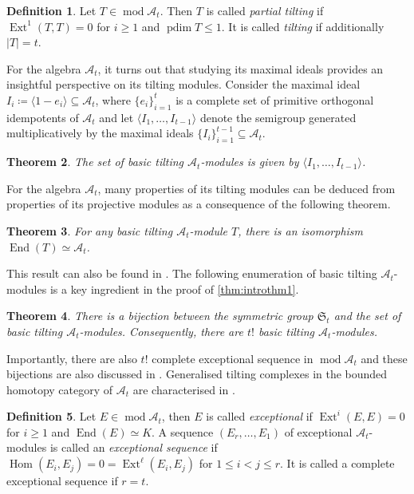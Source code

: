 \documentclass[10pt,twoside, a4paper,reqno]{amsart}
\DeclareMathOperator{\mods}{mod}
\DeclareMathOperator{\Ext}{Ext}
\DeclareMathOperator{\Hom}{Hom}
\DeclareMathOperator{\End}{End}
\DeclareMathOperator{\projdim}{pdim}
\newcommand{\A}{\mathscr{A}}
\newtheorem{theorem}{Theorem}[section]
\theoremstyle{definition}
\newtheorem{definition}[theorem]{Definition}
\begin{document}
\begin{definition}\label{defn:tilting}
    Let $T \in \mods \A_t$. Then $T$ is called \textit{partial tilting} if $\Ext^1(T,T) = 0$ for $i \geq 1$ and $\projdim T \leq 1$. It is called \textit{tilting} if additionally $|T|=t$.
\end{definition}

For the algebra $\A_t$, it turns out that studying its maximal ideals provides an insightful perspective on its tilting modules. Consider the maximal ideal $I_i \coloneqq \langle 1-e_i \rangle \subseteq \A_t$, where $\{e_i\}_{i=1}^t$ is a complete set of primitive orthogonal idempotents of $\A_t$ and let $\langle I_1, \dots, I_{t-1} \rangle$ denote the semigroup generated multiplicatively by the maximal ideals $\{I_i\}_{i=1}^{t-1} \subseteq \A_t$. 

\begin{theorem}\cite[Thm. 1.1(1)]{IyamaZhang2020}\label{thm:idealsemigroup}
    The set of basic tilting $\A_t$-modules is given by $\langle I_1, \dots, I_{t-1} \rangle$. 
\end{theorem}

For the algebra $\A_t$, many properties of its tilting modules can be deduced from properties of its projective modules as a consequence of the following theorem.

\begin{theorem}\cite[Thm. 4]{BHRR1999}\label{thm:tiltingendo}
    For any basic tilting $\A_t$-module $T$, there is an isomorphism $\End(T) \simeq \A_t$. 
\end{theorem}

This result can also be found in \cite[Thm. 3.6]{IyamaZhang2020}. The following enumeration of basic tilting $\A_t$-modules is a key ingredient in the proof of \cref{thm:introthm1}.

\begin{theorem}\cite[Thm. 3]{BHRR1999}\label{thm:BHRRcount}
    There is a bijection between the symmetric group $\mathfrak{S}_t$ and the set of basic tilting $\A_t$-modules. Consequently, there are $t!$ basic tilting $\A_t$-modules.
\end{theorem}

Importantly, there are also $t!$ complete exceptional sequence in $\mods \A_t$ \cite{HillePloog2019} and these bijections are also discussed in \cite[Sec. 9]{Geuenich2022}. Generalised tilting complexes in the bounded homotopy category of $\A_t$ are characterised in \cite{Geuenich2022, Sauter2019}.

\begin{definition}
	Let $E \in \mods \A_t$, then $E$ is called \textit{exceptional} if $\Ext^i(E,E) = 0$ for $i \geq 1$ and $\End(E) \simeq K$. A sequence $(E_r, \dots, E_1)$ of exceptional $\A_t$-modules is called an \textit{exceptional sequence} if $\Hom(E_i, E_j) = 0 = \Ext^{\ell}(E_i, E_j)$ for $1 \leq i < j \leq r$. It is called a complete exceptional sequence if $r=t$.
\end{definition}
\end{document}
